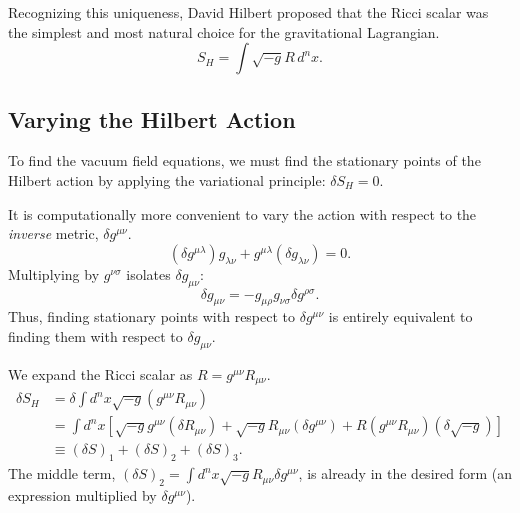 \documentclass[11pt, a4paper]{report}
\begin{document}
Recognizing this uniqueness, David Hilbert proposed that the Ricci scalar was the simplest and most natural choice for the gravitational Lagrangian. %
\begin{equation}
\label{eq:hilbert_action}
S_{H} = \int \sqrt{-g} R \, d^{n}x. %
\end{equation}

\subsection{Varying the Hilbert Action}

To find the vacuum field equations, we must find the stationary points of the Hilbert action by applying the variational principle: $\delta S_{H} = 0$. %

It is computationally more convenient to vary the action with respect to the \textit{inverse} metric, $\delta g^{\mu\nu}$. %
\begin{equation}
(\delta g^{\mu\lambda})g_{\lambda\nu} + g^{\mu\lambda}(\delta g_{\lambda\nu}) = 0.
\end{equation}
Multiplying by $g^{\nu\sigma}$ isolates $\delta g_{\mu\nu}$:
\begin{equation}
\label{eq:metric_variation_relation}
\delta g_{\mu\nu} = -g_{\mu\rho}g_{\nu\sigma} \delta g^{\rho\sigma}. %
\end{equation}
Thus, finding stationary points with respect to $\delta g^{\mu\nu}$ is entirely equivalent to finding them with respect to $\delta g_{\mu\nu}$. %

We expand the Ricci scalar as $R = g^{\mu\nu}R_{\mu\nu}$. %
\begin{align}
\delta S_{H} &= \delta \int d^{n}x \sqrt{-g} (g^{\mu\nu}R_{\mu\nu}) \nonumber \\
             &= \int d^{n}x \left[ \sqrt{-g} g^{\mu\nu} (\delta R_{\mu\nu}) + \sqrt{-g} R_{\mu\nu} (\delta g^{\mu\nu}) + R (g^{\mu\nu}R_{\mu\nu}) (\delta\sqrt{-g}) \right] \nonumber \\
             &\equiv (\delta S)_{1} + (\delta S)_{2} + (\delta S)_{3}. %
\end{align}
The middle term, $(\delta S)_{2} = \int d^{n}x \sqrt{-g} R_{\mu\nu} \delta g^{\mu\nu}$, is already in the desired form (an expression multiplied by $\delta g^{\mu\nu}$). %
\end{document}

